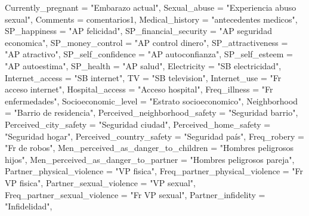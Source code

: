 \documentclass[
  bookmarksnumbered]{article}
\newenvironment{Shaded}{\begin{snugshade}}{\end{snugshade}}
\newcommand{\AttributeTok}[1]{\textcolor[rgb]{0.80,0.80,0.80}{#1}}
\newcommand{\NormalTok}[1]{\textcolor[rgb]{0.80,0.80,0.80}{#1}}
\newcommand{\StringTok}[1]{\textcolor[rgb]{0.80,0.58,0.58}{#1}}
\begin{document}
\begin{Shaded}
\begin{Highlighting}[]
    \AttributeTok{Currently\_pregnant =} \StringTok{"Embarazo actual"}\NormalTok{,}
    \AttributeTok{Sexual\_abuse =} \StringTok{"Experiencia abuso sexual"}\NormalTok{,}
    \AttributeTok{Comments =}\NormalTok{ comentarios1,}
    \AttributeTok{Medical\_history =} \StringTok{"antecedentes medicos"}\NormalTok{,}
    \AttributeTok{SP\_happiness =} \StringTok{"AP felicidad"}\NormalTok{,}
    \AttributeTok{SP\_financial\_security =} \StringTok{"AP seguridad economica"}\NormalTok{,}
    \AttributeTok{SP\_money\_control =} \StringTok{"AP control dinero"}\NormalTok{,}
    \AttributeTok{SP\_attractiveness =} \StringTok{"AP atractivo"}\NormalTok{,}
    \AttributeTok{SP\_self\_confidence =} \StringTok{"AP autoconfianza"}\NormalTok{,}
    \AttributeTok{SP\_self\_esteem =} \StringTok{"AP autoestima"}\NormalTok{,}
    \AttributeTok{SP\_health =} \StringTok{"AP salud"}\NormalTok{,}
    \AttributeTok{Electricity =} \StringTok{"SB electricidad"}\NormalTok{,}
    \AttributeTok{Internet\_access =} \StringTok{"SB internet"}\NormalTok{,}
    \AttributeTok{TV =} \StringTok{"SB television"}\NormalTok{,}
    \AttributeTok{Internet\_use =} \StringTok{"Fr acceso internet"}\NormalTok{,}
    \AttributeTok{Hospital\_access =} \StringTok{"Acceso hospital"}\NormalTok{,}
    \AttributeTok{Freq\_illness =} \StringTok{"Fr enfermedades"}\NormalTok{,}
    \AttributeTok{Socioeconomic\_level =} \StringTok{"Estrato socioeconomico"}\NormalTok{,}
    \AttributeTok{Neighborhood =} \StringTok{"Barrio de residencia"}\NormalTok{,}
    \AttributeTok{Perceived\_neighborhood\_safety =} \StringTok{"Seguridad barrio"}\NormalTok{,}
    \AttributeTok{Perceived\_city\_safety =} \StringTok{"Seguridad ciudad"}\NormalTok{,}
    \AttributeTok{Perceived\_home\_safety =} \StringTok{"Seguridad hogar"}\NormalTok{,}
    \AttributeTok{Perceived\_country\_safety =} \StringTok{"Seguridad país"}\NormalTok{,}
    \AttributeTok{Freq\_robery =} \StringTok{"Fr de robos"}\NormalTok{,}
    \AttributeTok{Men\_perceived\_as\_danger\_to\_children =} \StringTok{"Hombres peligrosos hijos"}\NormalTok{,}
    \AttributeTok{Men\_perceived\_as\_danger\_to\_partner =} \StringTok{"Hombres peligrosos pareja"}\NormalTok{,}
    \AttributeTok{Partner\_physical\_violence =} \StringTok{"VP fisica"}\NormalTok{,}
    \AttributeTok{Freq\_partner\_physical\_violence =} \StringTok{"Fr VP fisica"}\NormalTok{,}
    \AttributeTok{Partner\_sexual\_violence =} \StringTok{"VP sexual"}\NormalTok{,}
    \AttributeTok{Freq\_partner\_sexual\_violence =} \StringTok{"Fr VP sexual"}\NormalTok{,}
    \AttributeTok{Partner\_infidelity =} \StringTok{"Infidelidad"}\NormalTok{,}

\end{Highlighting}
\end{Shaded}
\end{document}
